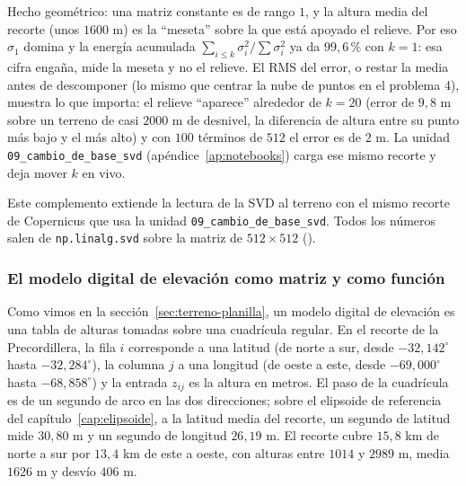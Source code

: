 Hecho geométrico: una matriz constante es de rango \(1\), y la altura media del recorte
(unos \(1600\) m) es la \enquote{meseta} sobre la que está apoyado el relieve. Por eso
\(\sigma_1\) domina y la energía acumulada \(\sum_{i\le k}\sigma_i^2/\sum\sigma_i^2\) ya
da \(99{,}6\)\,\% con \(k=1\): esa cifra engaña, mide la meseta y no el relieve. El RMS
del error, o restar la media antes de descomponer (lo mismo que centrar la nube de puntos
en el problema 4), muestra lo que importa: el relieve \enquote{aparece} alrededor de \(k=20\)
(error de \(9{,}8\) m sobre un terreno de casi \(2000\) m de desnivel, la diferencia de altura entre su punto más bajo y el más alto) y con \(100\)
términos de \(512\) el error es de \(2\) m. La unidad \texttt{09\_cambio\_de\_base\_svd}
(apéndice~\ref{ap:notebooks}) carga ese mismo recorte y deja mover \(k\) en vivo.



Este complemento extiende la lectura de la SVD al terreno con el mismo recorte de Copernicus que usa la unidad \texttt{09\_cambio\_de\_base\_svd}. Todos los números salen de \texttt{np.linalg.svd} sobre la matriz de \(512\times512\) ().

\subsubsection{El modelo digital de elevación como matriz y como función}

Como vimos en la sección~\ref{sec:terreno-planilla}, un modelo digital de elevación es una tabla
de alturas tomadas sobre una cuadrícula regular. En el recorte de la Precordillera, la fila \(i\) corresponde a una latitud (de norte
a sur, desde \(-32{,}142^\circ\) hasta \(-32{,}284^\circ\)), la columna \(j\) a una longitud
(de oeste a este, desde \(-69{,}000^\circ\) hasta \(-68{,}858^\circ\)) y la entrada
\(z_{ij}\) es la altura en metros. El paso de la cuadrícula es de un segundo de arco en las dos
direcciones; sobre el elipsoide de referencia del capítulo~\ref{cap:elipsoide}, a la latitud media del recorte, un segundo de latitud
mide \(30{,}80\) m y un segundo de longitud \(26{,}19\) m. El recorte cubre
\(15{,}8\) km de norte a sur por \(13{,}4\) km de este a oeste, con alturas entre
\(1014\) y \(2989\) m, media \(1626\) m y desvío \(406\) m.

